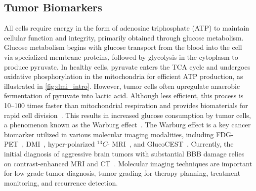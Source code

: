 \subsection{Tumor Biomarkers}
All cells require energy in the form of adenosine triphosphate (ATP) to maintain cellular function and integrity, primarily obtained through glucose metabolism. Glucose metabolism begins with glucose transport from the blood into the cell via specialized membrane proteins, followed by glycolysis in the cytoplasm to produce pyruvate. In healthy cells, pyruvate enters the \gls{TCA} cycle and undergoes oxidative phosphorylation in the mitochondria for efficient ATP production, as illustrated in \cref{fig:dmi_intro}. However, tumor cells often upregulate anaerobic fermentation of pyruvate into lactic acid. Although less efficient, this process is 10–100 times faster than mitochondrial respiration and provides biomaterials for rapid cell division~\cite{libertiWarburgEffectHow2016}. This results in increased glucose consumption by tumor cells, a phenomenon known as the Warburg effect~\cite{warburgOriginCancerCells1956}. The Warburg effect is a key cancer biomarker utilized in various molecular imaging modalities, including FDG-\gls{PET}~\cite{reivich18FfluorodeoxyglucoseMethodMeasurement1979}, \gls{DMI}~\cite{defeyterDeuteriumMetabolicImaging2021}, hyper-polarized $^{13}C$- \gls{MRI}~\cite{gordonTranslationCarbon13EPI2019}, and Gluco\gls{CEST}~\cite{capozzaGlucoCESTMRIEvaluation2022}. Currently, the initial diagnosis of aggressive brain tumors with substantial \gls{BBB} damage relies on contrast-enhanced \gls{MRI} and \gls{CT}~\cite{herholzBrainTumors2012}. Molecular imaging techniques are important for low-grade tumor diagnosis, tumor grading for therapy planning, treatment monitoring, and recurrence detection.

